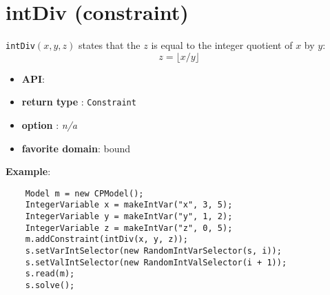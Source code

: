 \label{intdiv}
\hypertarget{intdiv}{}

\section{intDiv (constraint)}\label{intdiv:intdivconstraint}\hypertarget{intdiv:intdivconstraint}{}
\begin{notedef}
  \texttt{intDiv}$(x,y,z)$ states that the $z$ is equal to the integer quotient of $x$ by $y$:
$$z = \lfloor x / y \rfloor$$
\end{notedef}

\begin{itemize}
	\item \textbf{API}: 
	\item \textbf{return type} : \texttt{Constraint}
	\item \textbf{option} : \emph{n/a}
	\item \textbf{favorite domain}: bound
\end{itemize}

\textbf{Example}:
\begin{lstlisting}
	Model m = new CPModel();
	IntegerVariable x = makeIntVar("x", 3, 5);
	IntegerVariable y = makeIntVar("y", 1, 2);
	IntegerVariable z = makeIntVar("z", 0, 5);
	m.addConstraint(intDiv(x, y, z));
	s.setVarIntSelector(new RandomIntVarSelector(s, i));
	s.setValIntSelector(new RandomIntValSelector(i + 1));
	s.read(m);
	s.solve();
\end{lstlisting}
